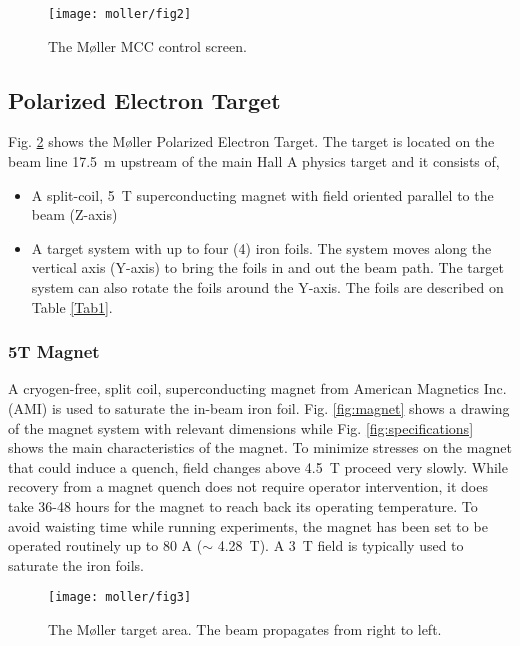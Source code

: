 {   \begin{figure}%
      \begin{center}
          \texttt{[image: moller/fig2]}
      \end{center}
      \caption[M{\o}ller:MCC control screen]{The M{\o}ller MCC control screen.
            }
      \label{fig:combo} 
   \end{figure}  
\subsection{Polarized Electron Target }
\vspace{-\parskip}

Fig. \ref{fig:target} shows the M{\o}ller Polarized Electron Target. The target is
located on the beam line 17.5~m upstream of the main Hall A physics target and it consists of,
\vspace{-\parskip}
\begin{itemize}
  \item A split-coil, 5~T superconducting magnet with field oriented parallel to the beam (Z-axis)
  \item A target system with up to four (4) iron foils. The system moves along the vertical axis (Y-axis) to bring the foils in and out the beam path. The target system can also rotate the foils around the Y-axis.
        The foils are described on Table \ref{Tab1}.
\end{itemize}

\subsubsection{5T Magnet}
\label{SHC_sssection}
A cryogen-free, split coil, superconducting magnet from American Magnetics Inc. (AMI) is used to saturate the in-beam iron foil. Fig. \ref{fig:magnet} shows a drawing of the magnet system with relevant dimensions while
Fig. \ref{fig:specifications} shows the main characteristics of the magnet. To minimize stresses on the magnet that could induce a quench, field changes above 4.5~T proceed very slowly. While recovery from a magnet quench does not require operator intervention, it does take 36-48 hours for the magnet to reach back its operating temperature. To avoid waisting time while running experiments, the magnet has been set to be operated routinely up to 80 A ($\sim$ 4.28~T). A 3~T field is typically used to saturate the iron foils. 
 
   \begin{figure}%
      \begin{center}
         \texttt{[image: moller/fig3]}
      \end{center}
      \caption[M{\o}ller:target]{The M{\o}ller target area. The beam propagates from right to left.
            }
      \label{fig:target} 
   \end{figure}  

}
